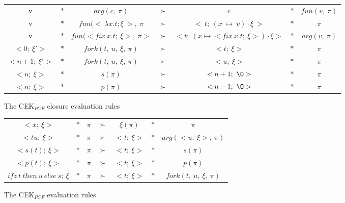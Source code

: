 \documentclass[a4paper,12pt]{article}
\begin{document}
\begin{figure}[ht]
  \begin{center}
    \begin{tabular}{|c c c c c c c|}
      \hline
      v & $*$ & $arg(c,~\pi)$ & $\succ$ & c & $*$ & $fun(v,~\pi)$ \\
      v & $*$ & $fun(<~\lambda x.t;\xi~>,~\pi$ & $\succ$ &
      $<~t;~(x~\mapsto~v)\cdot \xi~>$ 
      & $*$ & $\pi$ \\
      v & $*$ & $fun(<fix~x.t;~\xi>,~\pi>$ & $\succ$ &
      $<t;~(x\mapsto <fix~x.t;~\xi>) \cdot \xi>$ & $*$ & $arg(v,~\pi)$ \\
      $<0;~\xi'>$ & $*$ & $fork(t,~u,~\xi,~\pi)$ & $\succ$ &
      $<t;~\xi>$ & $*$ & $\pi$ \\
      $<n+1;~\xi'>$ & $*$ & $fork(t,~u,~\xi,~\pi)$ & $\succ$ &
      $<u;~\xi>$ & $*$ & $\pi$ \\
      $<n;~\xi>$ & $*$ & $s(\pi)$ & $\succ$ &
      $<n+1;~\O>$ & $*$ & $\pi$ \\
      $<n;~\xi>$ & $*$ & $p(\pi)$ & $\succ$ &
      $<n-1;~\O>$ & $*$ & $\pi$ \\
      \hline
    \end{tabular}
  \end{center}
  \caption{The CEK$_{PCF}$ closure evaluation rules}
  \label{cek-eval-closure}
\end{figure}


\begin{figure}
  \begin{center}
    \begin{tabular}{|c c c c c c c|}
      \hline
      $<x;~\xi>$ & $*$ & $\pi$ & $\succ$ & $\xi(\pi)$ & $*$ & $\pi$ \\
      $<tu;~\xi>$ & $*$ & $\pi$ & $\succ$ & $<t;~\xi>$ & $*$ & 
      $arg(<u;~\xi>,~\pi)$ \\
      $<s(t);~\xi>$ & $*$ & $\pi$ & $\succ$ & $<t;~\xi>$ & $*$ & 
      $s(\pi)$ \\
      $<p(t);~\xi>$ & $*$ & $\pi$ & $\succ$ & $<t;~\xi>$ & $*$ & 
      $p(\pi)$ \\
      $ifz~t~then~u~else~s;~\xi$ 
      & $*$ & $\pi$ & $\succ$ & $<t;~\xi>$ & $*$ & 
      $fork(t,~u,~\xi,~\pi)$ \\
      \hline
    \end{tabular}
  \end{center}
  \caption{The CEK$_{PCF}$ evaluation rules}
  \label{cek-eval-rules}
\end{figure}




\end{document}
